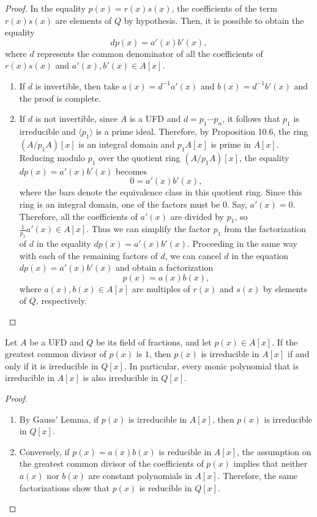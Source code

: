 \documentclass[11pt,a4paper]{article}
\begin{document}
\begin{proof}
In the equality $p(x) = r(x)s(x)$, the coefficients of the term $r(x)s(x)$ are elements of $Q$ by hypothesis. Then, it is possible to obtain the equality
\[
dp(x) = a'(x)b'(x),
\]
where $d$ represents the common denominator of all the coefficients of $r(x)s(x)$ and $a'(x), b'(x) \in A[x]$.

\begin{enumerate}[label=(\roman*)]
    \item If $d$ is invertible, then take $a(x) = d^{-1}a'(x)$ and $b(x) = d^{-1}b'(x)$ and the proof is complete.

    \item If $d$ is not invertible, since $A$ is a UFD and $d = p_1 \cdots p_n$, it follows that $p_1$ is irreducible and $\langle p_1 \rangle$ is a prime ideal. Therefore, by Proposition 10.6, the ring $(A/p_1A)[x]$ is an integral domain and $p_1A[x]$ is prime in $A[x]$. Reducing modulo $p_1$ over the quotient ring $(A/p_1A)[x]$, the equality $dp(x) = a'(x)b'(x)$ becomes
    \[
    0 = a'(x)b'(x),
    \]
    where the bars denote the equivalence class in this quotient ring. Since this ring is an integral domain, one of the factors must be $0$. Say, $a'(x) = 0$. Therefore, all the coefficients of $a'(x)$ are divided by $p_1$, so $\frac{1}{p_1}a'(x) \in A[x]$. Thus we can simplify the factor $p_1$ from the factorization of $d$ in the equality $dp(x) = a'(x)b'(x)$. Proceeding in the same way with each of the remaining factors of $d$, we can cancel $d$ in the equation $dp(x) = a'(x)b'(x)$ and obtain a factorization
    \[
    p(x) = a(x)b(x),
    \]
    where $a(x), b(x) \in A[x]$ are multiples of $r(x)$ and $s(x)$ by elements of $Q$, respectively.
\end{enumerate}
\end{proof}

\begin{cor}[10.2]
Let $A$ be a UFD and $Q$ be its field of fractions, and let $p(x) \in A[x]$. If the greatest common divisor of $p(x)$ is $1$, then $p(x)$ is irreducible in $A[x]$ if and only if it is irreducible in $Q[x]$. In particular, every monic polynomial that is irreducible in $A[x]$ is also irreducible in $Q[x]$.
\end{cor}
\begin{proof}
\begin{enumerate}[label=(\roman*)]
    \item By Gauss' Lemma, if $p(x)$ is irreducible in $A[x]$, then $p(x)$ is irreducible in $Q[x]$.
    \item Conversely, if $p(x) = a(x)b(x)$ is reducible in $A[x]$, the assumption on the greatest common divisor of the coefficients of $p(x)$ implies that neither $a(x)$ nor $b(x)$ are constant polynomials in $A[x]$. Therefore, the same factorizations show that $p(x)$ is reducible in $Q[x]$.
\end{enumerate}
\end{proof}
\end{document}
